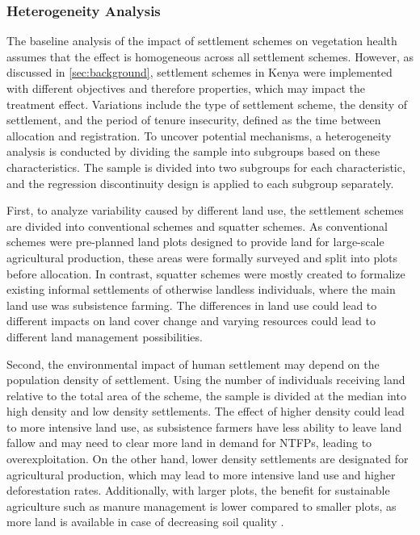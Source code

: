 \subsubsection{Heterogeneity Analysis}

The baseline analysis of the impact of settlement schemes on vegetation health assumes that the effect is homogeneous across all settlement schemes.
However, as discussed in \cref{sec:background}, settlement schemes in Kenya were implemented with different objectives and therefore properties, which may impact the treatment effect.
Variations include the type of settlement scheme, the density of settlement, and the period of tenure insecurity, defined as the time between allocation and registration.
To uncover potential mechanisms, a heterogeneity analysis is conducted by dividing the sample into subgroups based on these characteristics.
The sample is divided into two subgroups for each characteristic, and the regression discontinuity design is applied to each subgroup separately.

First, to analyze variability caused by different land use, the settlement schemes are divided into conventional schemes and squatter schemes.
As conventional schemes were pre-planned land plots designed to provide land for large-scale agricultural production, these areas were formally surveyed and split into plots before allocation.
In contrast, squatter schemes were mostly created to formalize existing informal settlements of otherwise landless individuals, where the main land use was subsistence farming.
The differences in land use could lead to different impacts on land cover change and varying resources could lead to different land management possibilities.

Second, the environmental impact of human settlement may depend on the population density of settlement.
Using the number of individuals receiving land relative to the total area of the scheme, the sample is divided at the median into high density and low density settlements.
The effect of higher density could lead to more intensive land use, as subsistence farmers have less ability to leave land fallow and may need to clear more land in demand for NTFPs, leading to overexploitation.
On the other hand, lower density settlements are designated for agricultural production, which may lead to more intensive land use and higher deforestation rates.
Additionally, with larger plots, the benefit for sustainable agriculture such as manure management is lower compared to smaller plots, as more land is available in case of decreasing soil quality \parencite{brandtSustainableIntensificationDairy2018}.

